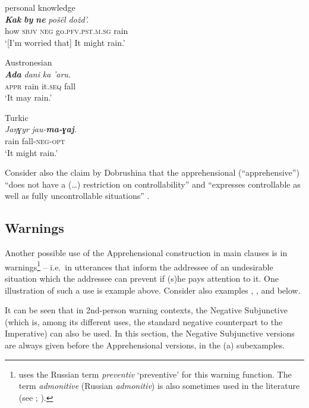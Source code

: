 \documentclass[output=paper,colorlinks,citecolor=brown]{langscibook}
\begin{document}
\ea \label{ex:Fed21}  {} {personal knowledge} \\
\gll \textit{\textbf{Kak}} \textit{\textbf{by}} \textit{\textbf{ne}} \textit{pošël} \textit{dožd'.} \\
how \textsc{sbjv} \textsc{neg} go.\textsc{pfv.pst.m.sg} rain \\
\glt `[I'm worried that] It might rain.'
\z


\ea \label{ex:Fed22} 
 {Austronesian}{\citealt[295]{lichtenberk1995}}  \\
\gll \textit{\textbf{Ada}} \textit{dani} \textit{ka} \textit{'aru.} \\
\textsc{appr} rain it.\textsc{seq} fall \\
\glt `It may rain.'
\z


\ea \label{ex:Fed23}  {Turkic} {\citealt[33]{Dobrushina2006}} \\
\gll \textit{Jaŋɣyr} \textit{jau-\textbf{ma-ɣaj}.} \\
rain fall-\textsc{neg-opt} \\
\glt `It might rain.'
\z

 Consider also the claim by Dobrushina that the apprehensional (``apprehensive'') ``does not have a (\dots) restriction on controllability'' and ``expresses controllable as well as fully uncontrollable situations'' \citep[57--59]{Dobrushina2006}.


\subsection{Warnings}
\label{subsec:warnings}

Another possible use of the Apprehensional construction in main clauses is in warnings\footnote{\citet{Dobrushina2006} uses the Russian term \textit{preventiv} `preventive' for this warning function. The term \textit{admonitive} (Russian \textit{admonitiv}) is also sometimes used in the literature (see \cite[39--40]{vuillermet2018}; \cite[29]{Dobrushina2006}).} -- i.e.\ in utterances that inform the addressee of an undesirable situation which the addressee can prevent if (s)he pays attention to it. One illustration of such a use is example  above. Consider also examples , , and  below.

It can be seen that in 2nd-person warning contexts, the Negative Subjunctive (which is, among its different uses, the standard negative counterpart to the Imperative) can also be used. In this section, the Negative Subjunctive versions are always given before the Apprehensional versions, in the (a) subexamples.
\end{document}
